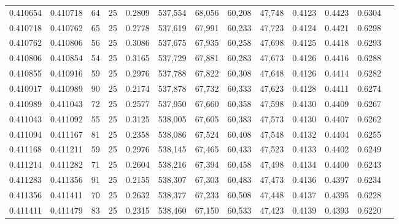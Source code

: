 \begin{tabular}{rrrrrrrrrrrrr}
0.410654 & 0.410718 &    64 &  25 &                                     0.2809 & 537,554 &  68,056 &  60,208 &  47,748 & 0.4123 & 0.4423 & 0.6304 \\
0.410718 & 0.410762 &    65 &  25 &                                     0.2778 & 537,619 &  67,991 &  60,233 &  47,723 & 0.4124 & 0.4421 & 0.6298 \\
0.410762 & 0.410806 &    56 &  25 &                                     0.3086 & 537,675 &  67,935 &  60,258 &  47,698 & 0.4125 & 0.4418 & 0.6293 \\
0.410806 & 0.410854 &    54 &  25 &                                     0.3165 & 537,729 &  67,881 &  60,283 &  47,673 & 0.4126 & 0.4416 & 0.6288 \\
0.410855 & 0.410916 &    59 &  25 &                                     0.2976 & 537,788 &  67,822 &  60,308 &  47,648 & 0.4126 & 0.4414 & 0.6282 \\
0.410917 & 0.410989 &    90 &  25 &                                     0.2174 & 537,878 &  67,732 &  60,333 &  47,623 & 0.4128 & 0.4411 & 0.6274 \\
0.410989 & 0.411043 &    72 &  25 &                                     0.2577 & 537,950 &  67,660 &  60,358 &  47,598 & 0.4130 & 0.4409 & 0.6267 \\
0.411043 & 0.411092 &    55 &  25 &                                     0.3125 & 538,005 &  67,605 &  60,383 &  47,573 & 0.4130 & 0.4407 & 0.6262 \\
0.411094 & 0.411167 &    81 &  25 &                                     0.2358 & 538,086 &  67,524 &  60,408 &  47,548 & 0.4132 & 0.4404 & 0.6255 \\
0.411168 & 0.411211 &    59 &  25 &                                     0.2976 & 538,145 &  67,465 &  60,433 &  47,523 & 0.4133 & 0.4402 & 0.6249 \\
0.411214 & 0.411282 &    71 &  25 &                                     0.2604 & 538,216 &  67,394 &  60,458 &  47,498 & 0.4134 & 0.4400 & 0.6243 \\
0.411283 & 0.411356 &    91 &  25 &                                     0.2155 & 538,307 &  67,303 &  60,483 &  47,473 & 0.4136 & 0.4397 & 0.6234 \\
0.411356 & 0.411411 &    70 &  25 &                                     0.2632 & 538,377 &  67,233 &  60,508 &  47,448 & 0.4137 & 0.4395 & 0.6228 \\
0.411411 & 0.411479 &    83 &  25 &                                     0.2315 & 538,460 &  67,150 &  60,533 &  47,423 & 0.4139 & 0.4393 & 0.6220 \\

\end{tabular}
